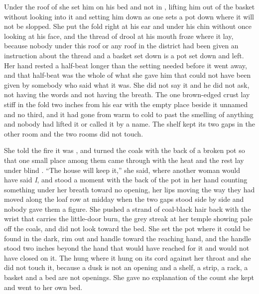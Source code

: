 Under the roof of  she set him on his bed and not in , lifting him out of the basket without looking into it and setting him down as one sets a pot down where it will not be slopped. She put the fold right at his ear and under his chin without once looking at his face, and the thread of drool at his mouth froze where it lay, because nobody under this roof or any roof in the district had been given an instruction about the thread and a basket set down is a pot set down and left. Her hand rested a half-beat longer than the setting needed before it went away, and that half-beat was the whole of what she gave him that could not have been given by somebody who said what it was. She did not say it and he did not ask, not having the words and not having the breath. The one brown-edged crust lay stiff in the fold two inches from his ear with the empty place beside it unnamed and no third, and it had gone from warm to cold to past the smelling of anything and nobody had lifted it or called it by a name. The shelf kept its two gaps in the other room and the two rooms did not touch.

She told the fire it was , and turned the coals with the back of a broken pot so that one small place among them came through with the heat and the rest lay under blind . “The house will keep it,” she said, where another woman would have said \emph{I}, and stood a moment with the back of the pot in her hand counting something under her breath toward no opening, her lips moving the way they had moved along the loaf row at midday when the two gaps stood side by side and nobody gave them a figure. She pushed a strand of coal-black hair back with the wrist that carries the little-door burn, the grey streak at her temple showing pale off the coals, and did not look toward the bed. She set the pot where it could be found in the dark, rim out and handle toward the reaching hand, and the handle stood two inches beyond the hand that would have reached for it and would not have closed on it. The  hung where it hung on its cord against her throat and she did not touch it, because a dusk is not an opening and a shelf, a strip, a rack, a basket and a bed are not openings. She gave no explanation of the count she kept and went to her own bed.

\scenebreak

